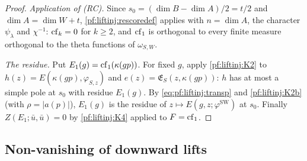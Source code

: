 \begin{proof}
\emph{Application of (RC).} Since $s_0=(\dim B-\dim A)/2=t/2$ and $\dim A=\dim W+t$, \cref{pf:liftinj:rescoredef} applies with $n=\dim A$, the
character $\psi_\lambda$ and $\chi^{-1}$: $\operatorname{cf}_k=0$ for $k\ge2$, and $\operatorname{cf}_1$ is orthogonal to every finite measure orthogonal to the
theta functions of $\omega_{S,W}$.

\emph{The residue.} Put $E_1(g)=\operatorname{cf}_1(\kappa(gp))$. For fixed $g$, apply \cref{pf:liftinj:K2} to $h(z)=E(\kappa(gp),\varphi_{S,z})$ and
$e(z)=\mathfrak E_S(z,\kappa(gp))$: $h$ has at most a simple pole at $s_0$ with residue $E_1(g)$. By \eqref{eq:pf:liftinj:transp} and
\cref{pf:liftinj:K2b} (with $\rho=|a(p)|$), $E_1(g)$ is the residue of $z\mapsto E(g,z;\varphi^{\mathrm{SW}})$ at $s_0$. Finally
$Z(E_1;\bar u,\bar u)=0$ by \cref{pf:liftinj:K4} applied to $F=\operatorname{cf}_1$.
\end{proof}

\subsection{Non-vanishing of downward lifts}\label{sec:pf:liftinj:dn}

